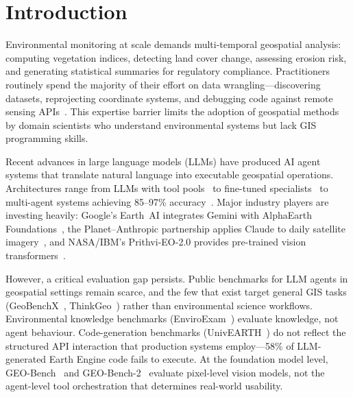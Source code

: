 \documentclass[10pt,twocolumn]{article}
\begin{document}
\section{Introduction}
\label{sec:intro}

Environmental monitoring at scale demands multi-temporal geospatial analysis: computing vegetation indices, detecting land cover change, assessing erosion risk, and generating statistical summaries for regulatory compliance. Practitioners routinely spend the majority of their effort on data wrangling---discovering datasets, reprojecting coordinate systems, and debugging code against remote sensing APIs~\cite{zhang2023geogpt, li2023llmgeo}. This expertise barrier limits the adoption of geospatial methods by domain scientists who understand environmental systems but lack GIS programming skills.

Recent advances in large language models (LLMs) have produced AI agent systems that translate natural language into executable geospatial operations. Architectures range from LLMs with tool pools~\citep{zhang2023geogpt, akinboyewa2024giscopilot} to fine-tuned specialists~\citep{zhang2024gtchain, zhang2025envgpt} to multi-agent systems achieving 85--97\% accuracy~\citep{luo2025geojsonagents, lee2025geollmsquad}. Major industry players are investing heavily: Google's Earth~AI integrates Gemini with AlphaEarth Foundations~\citep{google2025earthai}, the Planet--Anthropic partnership applies Claude to daily satellite imagery~\citep{planet2025anthropic}, and NASA/IBM's Prithvi-EO-2.0 provides pre-trained vision transformers~\citep{szwarcman2024prithvi}.

However, a critical evaluation gap persists. Public benchmarks for LLM agents in geospatial settings remain scarce, and the few that exist target general GIS tasks (GeoBenchX~\citep{krechetova2025geobenchx}, ThinkGeo~\citep{shabbir2025thinkgeo}) rather than environmental science workflows. Environmental knowledge benchmarks (EnviroExam~\citep{huang2024enviroexam}) evaluate knowledge, not agent behaviour. Code-generation benchmarks (UnivEARTH~\citep{kao2025univearth}) do not reflect the structured API interaction that production systems employ---58\% of LLM-generated Earth Engine code fails to execute. At the foundation model level, GEO-Bench~\citep{lacoste2023geobench} and GEO-Bench-2~\citep{simumba2025geobench2} evaluate pixel-level vision models, not the agent-level tool orchestration that determines real-world usability.
\end{document}
